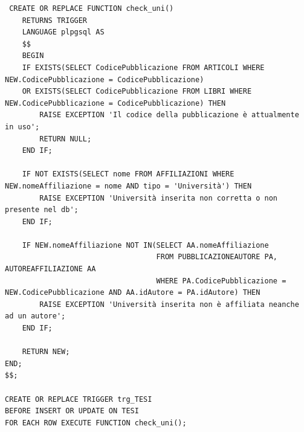\documentclass[a4paper,12pt]{article}
\begin{document}
\begin{lstlisting}
 CREATE OR REPLACE FUNCTION check_uni()
    RETURNS TRIGGER
    LANGUAGE plpgsql AS 
    $$
    BEGIN
    IF EXISTS(SELECT CodicePubblicazione FROM ARTICOLI WHERE NEW.CodicePubblicazione = CodicePubblicazione)
    OR EXISTS(SELECT CodicePubblicazione FROM LIBRI WHERE NEW.CodicePubblicazione = CodicePubblicazione) THEN
        RAISE EXCEPTION 'Il codice della pubblicazione è attualmente in uso';
        RETURN NULL;
    END IF;
    
    IF NOT EXISTS(SELECT nome FROM AFFILIAZIONI WHERE NEW.nomeAffiliazione = nome AND tipo = 'Università') THEN
        RAISE EXCEPTION 'Università inserita non corretta o non presente nel db';
    END IF;
    
    IF NEW.nomeAffiliazione NOT IN(SELECT AA.nomeAffiliazione
                                   FROM PUBBLICAZIONEAUTORE PA, AUTOREAFFILIAZIONE AA
                                   WHERE PA.CodicePubblicazione = NEW.CodicePubblicazione AND AA.idAutore = PA.idAutore) THEN
        RAISE EXCEPTION 'Università inserita non è affiliata neanche ad un autore';
    END IF;
        
    RETURN NEW;
END;
$$;

CREATE OR REPLACE TRIGGER trg_TESI
BEFORE INSERT OR UPDATE ON TESI
FOR EACH ROW EXECUTE FUNCTION check_uni();
\end{lstlisting}
\end{document}
